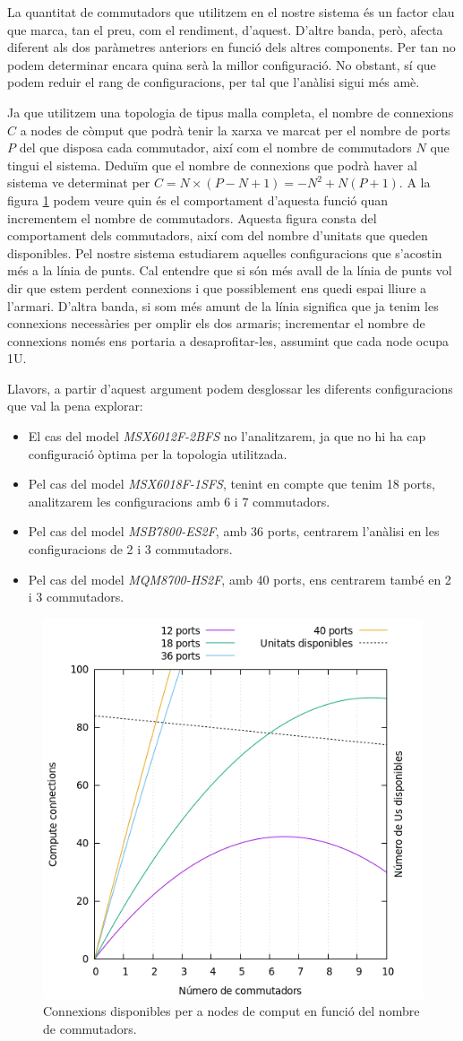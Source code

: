 La quantitat de commutadors que utilitzem en el nostre sistema és un factor clau que marca,
tan el preu, com el rendiment, d'aquest. D'altre banda, però, afecta diferent als dos paràmetres
anteriors en funció dels altres components. Per tan no podem determinar encara quina serà la
millor configuració. No obstant, sí que podem reduir el rang de configuracions, per tal que
l'anàlisi sigui més amè.

Ja que utilitzem una topologia de tipus malla completa, el nombre de connexions $C$ a nodes de còmput
que podrà tenir la xarxa ve marcat per el nombre de ports $P$ del que disposa cada commutador, així
com el nombre de commutadors $N$ que tingui el sistema. Deduïm que el nombre de connexions
que podrà haver al sistema ve determinat per $C = N \times ( P - N + 1 ) = -N^2 + N(P+1)$.
A la figura \ref{fig:connections} podem veure quin és el comportament d'aquesta funció quan incrementem
el nombre de commutadors. Aquesta figura consta del comportament dels commutadors, així com del nombre 
d'unitats que queden disponibles. Pel nostre sistema estudiarem aquelles configuracions que s'acostin 
més a la línia de punts. Cal entendre que si són més avall de la línia de punts vol dir que estem perdent connexions
i que possiblement ens quedi espai lliure a l'armari. D'altra banda, si som més amunt de la línia 
significa que ja tenim les connexions necessàries per omplir els dos armaris; incrementar el nombre de connexions
només ens portaria a desaprofitar-les, assumint que cada node ocupa 1U.

Llavors, a partir d'aquest argument podem desglossar les diferents configuracions que val la pena explorar:
\begin{itemize}
  \item El cas del model \textit{MSX6012F-2BFS} no l'analitzarem, ja que no hi ha cap configuració òptima per la topologia utilitzada.
  \item Pel cas del model \textit{MSX6018F-1SFS}, tenint en compte que tenim 18 ports, analitzarem les configuracions amb 6 i 7 commutadors.
  \item Pel cas del model \textit{MSB7800-ES2F}, amb 36 ports, centrarem l'anàlisi en les configuracions de 2 i 3 commutadors.
  \item Pel cas del model \textit{MQM8700-HS2F}, amb 40 ports, ens centrarem també en 2 i 3 commutadors.
\end{itemize}

\begin{figure}[h!]
    \centering
    \includegraphics[width=0.6\linewidth]{img/connections.png}
    \caption{Connexions disponibles per a nodes de comput en funció del nombre de commutadors.}
    
    \label{fig:connections}
\end{figure}

